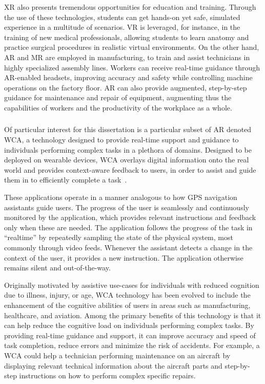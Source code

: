 \gls{XR} also presents tremendous opportunities for education and training.
Through the use of these technologies, students can get hands-on yet safe, simulated experience in a multitude of scenarios.
\gls{VR} is leveraged, for instance, in the training of new medical professionals, allowing students to learn anatomy and practice surgical procedures in realistic virtual environments.
On the other hand, \gls{AR} and \gls{MR} are employed in manufacturing, to train and assist technicians in highly specialized assembly lines.
Workers can receive real-time guidance through \gls{AR}-enabled headsets, improving accuracy and safety while controlling machine operations on the factory floor.
\gls{AR} can also provide augmented, step-by-step guidance for maintenance and repair of equipment, augmenting thus the capabilities of workers and the productivity of the workplace as a whole.

\subsubsection{}

Of particular interest for this dissertation is a particular subset of \gls{AR} denoted \acf{WCA}, a technology designed to provide real-time support and guidance to individuals performing complex tasks in a plethora of domains.
Designed to be deployed on wearable devices, \gls{WCA} overlays digital information onto the real world and provides context-aware feedback to users, in order to assist and guide them in to efficiently complete a task~\cite{ha2014towards,chen2015early,chen2018application,wang2020scaling}.

These applications operate in a manner analogous to how \gls{GPS} navigation assistants guide users. 
The progress of the user is seamlessly and continuously monitored by the application, which provides relevant instructions and feedback only when these are needed.
The application follows the progress of the task in ``realtime'' by repeatedly sampling the state of the physical system, most commonly through video feeds.
Whenever the assistant detects a change in the context of the user, it provides a new instruction.
The application otherwise remains silent and out-of-the-way.

Originally motivated by assistive use-cases for individuals with reduced cognition due to illness, injury, or age, \gls{WCA} technology has been evolved to include the enhancement of the cognitive abilities of users in areas such as manufacturing, healthcare, and aviation.
Among the primary benefits of this technology is that it can help reduce the cognitive load on individuals performing complex tasks.
By providing real-time guidance and support, it can improve accuracy and speed of task completion, reduce errors and minimize the risk of accidents.
For example, a \gls{WCA} could help a technician performing maintenance on an aircraft by displaying relevant technical information about the aircraft parts and step-by-step instructions on how to perform complex specific repairs.

